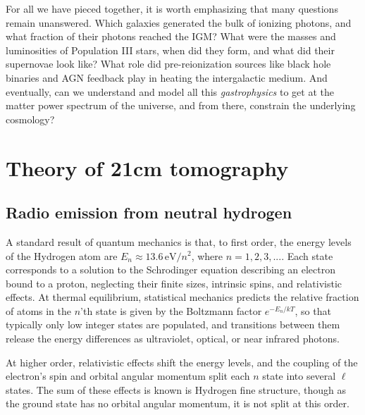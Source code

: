 For all we have pieced together, it is worth emphasizing that many questions remain unanswered. Which galaxies generated the bulk of ionizing photons, and what fraction of their photons reached the IGM? What were the masses and luminosities of Population III stars, when did they form, and what did their supernovae look like? What role did pre-reionization sources like black hole binaries and AGN feedback play in heating the intergalactic medium. And eventually, can we understand and model all this \textit{gastrophysics} to get at the matter power spectrum of the universe, and from there, constrain the underlying cosmology?

\section{Theory of 21cm tomography}
\label{sec:intro21cmsection}

\subsection{Radio emission from neutral hydrogen}

A standard result of quantum mechanics \citep[e.g.,][]{griffithsqm} is that, to first order, the energy levels of the Hydrogen atom are $E_n\approx13.6\,\text{eV}/n^2$, where $n=1,2,3,...$. Each state corresponds to a solution to the Schrodinger equation describing an electron bound to a proton, neglecting their finite sizes, intrinsic spins, and relativistic effects. At thermal equilibrium, statistical mechanics predicts the relative fraction of atoms in the $n$'th state is given by the Boltzmann factor $e^{-E_n/kT}$, so that typically only low integer states are populated, and transitions between them release the energy differences as ultraviolet, optical, or near infrared photons. 

At higher order, relativistic effects shift the energy levels, and the coupling of the electron's spin and orbital angular momentum split each $n$ state into several $\ell$ states. The sum of these effects is known is Hydrogen fine structure, though as the ground state has no orbital angular momentum, it is not split at this order. 

